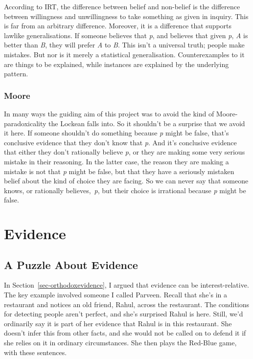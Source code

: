 \documentclass[
  10pt,
  letterpaper,
  twoside]{scrbook}
\begin{document}
According to IRT, the difference between belief and non-belief is the
difference between willingness and unwillingness to take something as
given in inquiry. This is far from an arbitrary difference. Moreover, it
is a difference that supports lawlike generalisations. If someone
believes that \emph{p}, and believes that given \emph{p}, \emph{A} is
better than \emph{B}, they will prefer \emph{A} to \emph{B}. This isn't
a universal truth; people make mistakes. But nor is it merely a
statistical generalisation. Counterexamples to it are things to be
explained, while instances are explained by the underlying pattern.

\subsection{Moore}\label{moore}

In many ways the guiding aim of this project was to avoid the kind of
Moore-paradoxicality the Lockean falls into. So it shouldn't be a
surprise that we avoid it here. If someone shouldn't do something
because \emph{p} might be false, that's conclusive evidence that they
don't know that \emph{p}. And it's conclusive evidence that either they
don't rationally believe \emph{p}, or they are making some very serious
mistake in their reasoning. In the latter case, the reason they are
making a mistake is not that \emph{p} might be false, but that they have
a seriously mistaken belief about the kind of choice they are facing. So
we can never say that someone knows, or rationally believes,~\emph{p},
but their choice is irrational because \emph{p} might be false.


\chapter{Evidence}\label{sec-evidence}

\section{A Puzzle About Evidence}\label{sec-evpuzzle}

In Section~\ref{sec-orthodoxevidence}, I argued that evidence can be
interest-relative. The key example involved someone I called Parveen.
Recall that she's in a restaurant and notices an old friend, Rahul,
across the restaurant. The conditions for detecting people aren't
perfect, and she's surprised Rahul is here. Still, we'd ordinarily say
it is part of her evidence that Rahul is in this restaurant. She doesn't
infer this from other facts, and she would not be called on to defend it
if she relies on it in ordinary circumstances. She then plays the
Red-Blue game, with these sentences.
\end{document}
